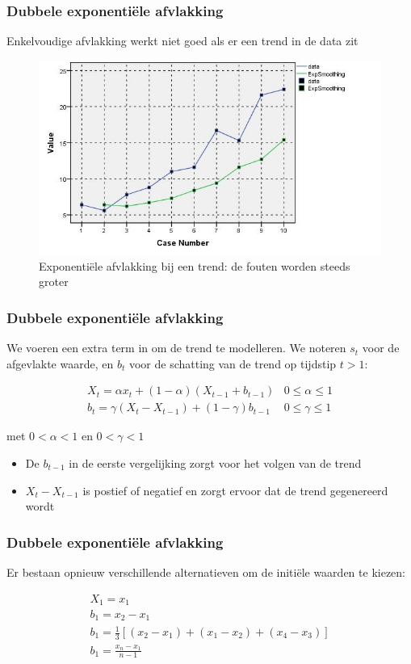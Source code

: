 \documentclass{beamer}
\begin{document}
\begin{frame}
  \frametitle{Dubbele exponenti\"ele afvlakking}

  Enkelvoudige afvlakking werkt niet goed als er een trend in de data zit

  \begin{figure}
    \centering
    \includegraphics[width=.7\textwidth]{img/tijdreeks61}
    \caption{Exponenti\"ele afvlakking bij een trend: de fouten worden steeds groter}
    \label{fig:tijdreeks61}
  \end{figure}

\end{frame}


\begin{frame}
  \frametitle{Dubbele exponentiële afvlakking}

  We voeren een extra term in om de trend te modelleren. We noteren $s_t$ voor de afgevlakte waarde, en $b_t$ voor de schatting van de trend op tijdstip $t > 1$:

\begin{eqnarray}
	X_{t} = \alpha x_{t} + (1-\alpha)(X_{t-1} + b_{t-1}) & 0 \leq \alpha \leq 1 \\
	b_{t} = \gamma(X_{t}-X_{t-1}) + (1-\gamma)b_{t-1} & 0 \leq \gamma \leq 1 
\label{eq:doubleSmoothing}
\end{eqnarray}

  met $0 < \alpha < 1$ en $0 < \gamma < 1$
	
	
	\begin{itemize}
		\item De $ b_{t-1}$ in de eerste vergelijking zorgt voor het volgen van de trend
		\item $X_{t}-X_{t-1}$ is postief of negatief en zorgt ervoor dat de trend gegenereerd wordt
	\end{itemize}
\end{frame}

\begin{frame}
  \frametitle{Dubbele exponentiële afvlakking}
  Er bestaan opnieuw verschillende alternatieven om de initiële waarden te kiezen:

\begin{eqnarray}
	X_{1} = x_{1} \\
	b_{1} = x_{2} - x_{1} \\
	b_{1} = \frac{1}{3}\left[ (x_{2} - x_{1}) + (x_{1} - x_{2}) + (x_{4} - x_{3}) \right]\\
	b_{1} = \frac{x_{n} - x_{1}}{n-1} \\
\end{eqnarray}

\end{frame}
\end{document}
